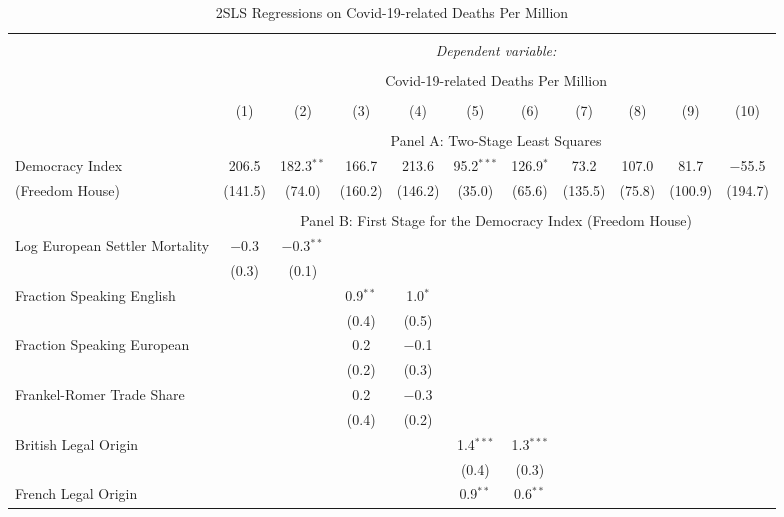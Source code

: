 
\begin{table}[!htbp] \centering
  \caption{2SLS Regressions on Covid-19-related Deaths Per Million}
  \label{tab:2sls-deaths-continent} 
  \footnotesize
  \begin{threeparttable}
\begin{tabular}{@{\extracolsep{0pt}}lcccccccccc} 
\\[-1.8ex]\hline 
\hline \\[-1.8ex] 
 & \multicolumn{10}{c}{\textit{Dependent variable:}} \\ 
\cline{2-11} 
\\[-1.8ex] & \multicolumn{10}{c}{Covid-19-related Deaths Per Million} \\ 
\\[-1.8ex] & (1) & (2) & (3) & (4) & (5) & (6) & (7) & (8) & (9) & (10)\\ 
\hline \\[-1.8ex] 
  & \multicolumn{10}{c}{Panel A: Two-Stage Least Squares} \\
Democracy Index & 206.5 & 182.3$^{**}$ & 166.7 & 213.6 & 95.2$^{***}$ & 126.9$^{*}$ & 73.2 & 107.0 & 81.7 & $-$55.5 \\ 
(Freedom House)  & (141.5) & (74.0) & (160.2) & (146.2) & (35.0) & (65.6) & (135.5) & (75.8) & (100.9) & (194.7) \\ 
\hline \\[-1.8ex] 
   & \multicolumn{10}{c}{Panel B: First Stage for the Democracy Index (Freedom House)} \\
  Log European Settler Mortality & $-$0.3 & $-$0.3$^{**}$ &  &  &  &  &  &  &  &  \\ 
  & (0.3) & (0.1) &  &  &  &  &  &  &  &  \\ 
  Fraction Speaking English &  &  & 0.9$^{**}$ & 1.0$^{*}$ &  &  &  &  &  &  \\ 
  &  &  & (0.4) & (0.5) &  &  &  &  &  &  \\ 
  Fraction Speaking European &  &  & 0.2 & $-$0.1 &  &  &  &  &  &  \\ 
  &  &  & (0.2) & (0.3) &  &  &  &  &  &  \\ 
  Frankel-Romer Trade Share &  &  & 0.2 & $-$0.3 &  &  &  &  &  &  \\ 
  &  &  & (0.4) & (0.2) &  &  &  &  &  &  \\ 
  British Legal Origin &  &  &  &  & 1.4$^{***}$ & 1.3$^{***}$ &  &  &  &  \\ 
  &  &  &  &  & (0.4) & (0.3) &  &  &  &  \\ 
  French Legal Origin &  &  &  &  & 0.9$^{**}$ & 0.6$^{**}$ &  &  &  &  \\ 

\end{tabular}
\end{threeparttable}
\end{table}
